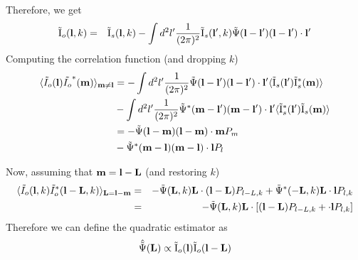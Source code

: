 \documentclass[12pt]{article}
\newcommand{\beq}{\begin{equation}}
\newcommand{\eeq}{\end{equation}}
\newcommand{\beqa}{\begin{eqnarray}}
\newcommand{\eeqa}{\end{eqnarray}}
\newcommand{\beqal}{\begin{aligned}}
\newcommand{\eeqal}{\end{aligned}}
\def\l{{\bf l}}
\def\L{{\bf L}}
\def\il{{\tilde{\rm I}}}
\numberwithin{equation}{section}
\begin{document}
Therefore, we get
\begin{eqnarray}
\il_o(\l,k) &=& \il_s(\l, k) - \int {d^2l'} \frac{1}{(2\pi)^2}\il_s(\l',k)\tilde{\Psi}(\l-\l')(\l-\l')\cdot
\l'
\end{eqnarray}
Computing the correlation function (and dropping $ k $)
\beq
\beqal
\langle \tilde I_o (\l) \tilde{I_o}^*(\textbf{m}) \rangle _{\textbf{m} \neq \textbf{l}} &= - \int {d^2 l'}  \frac{1}{(2\pi)^2}\tilde{\Psi}(\l-\l')(\l-\l')\cdot \l'  \langle \il_s(\l^\prime) \il_s^*(\textbf{m})  \rangle 
\\
& -  \int {d^2 l'}  \frac{1}{(2\pi)^2}\tilde{\Psi}^*(\textbf{m}-\l')(\textbf{m}-\l')\cdot \l'  \langle \il_s^*(\l^\prime) \il_s(\textbf{m}) \rangle
 \\
 &= -  \tilde{\Psi}(\l-\textbf{m})(\l-\textbf{m})\cdot \textbf{m}  P_m 
 \\
&  -   \tilde{\Psi}^*(\textbf{m}-\l)(\textbf{m}-\l)\cdot \l  P_l
\eeqal
\eeq

Now, assuming that $ \textbf{m} = \l- \L $ (and restoring $ k $)
\begin{eqnarray}
\langle \tilde I_o (\l,k) \tilde{I}_o^*(\l - \L, k) \rangle _{\textbf{L}  = \l - \textbf{m}} &=& -  \tilde{\Psi}(\L, k)\L\cdot (\textbf{l} - \textbf{L})  P_{l - L, k} +   \tilde{\Psi}^*(-\L, k)\L\cdot \l  P_{l, k} \\
&=& -  \tilde{\Psi}(\L, k)\L \cdot \left[(\textbf{l} - \textbf{L})  P_{l - L, k} +  \cdot \l  P_{l, k}\right] \label{eq: dodelson_correlation}
\end{eqnarray}
%
Therefore we can define the quadratic estimator as
\beqa
\hat{\tilde{\Psi}}(\L) \propto \il_o(\l) \il_o(\l - \L)
\eeqa
%
\end{document}
